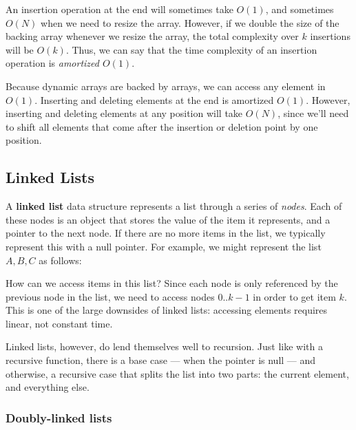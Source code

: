 An insertion operation at the end will sometimes take $O(1)$, and sometimes $O(N)$ when we need to resize the array. However, if we double the size of the backing array whenever we resize the array, the total complexity over $k$ insertions will be $O(k)$. Thus, we can say that the time complexity of an insertion operation is \textit{amortized $O(1)$}.

Because dynamic arrays are backed by arrays, we can access any element in $O(1)$. Inserting and deleting elements at the end is amortized $O(1)$. However, inserting and deleting elements at any position will take $O(N)$, since we'll need to shift all elements that come after the insertion or deletion point by one position.


\subsection{Linked Lists}

A \textbf{linked list} data structure represents a list through a series of \textit{nodes}. Each of these nodes is an object that stores the value of the item it represents, and a pointer to the next node. If there are no more items in the list, we typically represent this with a null pointer. For example, we might represent the list $A, B, C$ as follows:


How can we access items in this list? Since each node is only referenced by the previous node in the list, we need to access nodes $0..k-1$ in order to get item $k$. This is one of the large downsides of linked lists: accessing elements requires linear, not constant time.

Linked lists, however, do lend themselves well to recursion. Just like with a recursive function, there is a base case --- when the pointer is null --- and otherwise, a recursive case that splits the list into two parts: the current element, and everything else.

\subsubsection{Doubly-linked lists}

